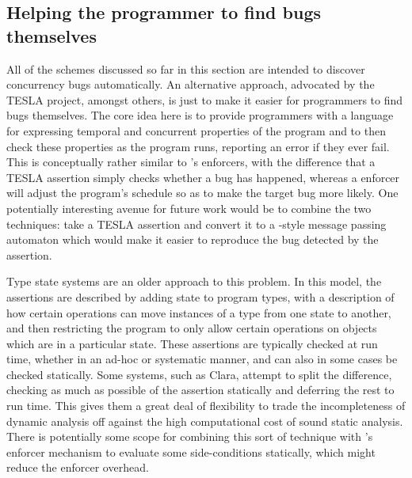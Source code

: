 \subsection{Helping the programmer to find bugs themselves}

All of the schemes discussed so far in this section are intended to
discover concurrency bugs automatically.  An alternative approach,
advocated by the TESLA project\needCite{}, amongst others, is just to
make it easier for programmers to find bugs themselves.  The core idea
here is to provide programmers with a language for expressing temporal
and concurrent properties of the program and to then check these
properties as the program runs, reporting an error if they ever fail.
This is conceptually rather similar to {\technique}'s enforcers, with
the difference that a TESLA assertion simply checks whether a bug has
happened, whereas a {\technique} enforcer will adjust the program's
schedule so as to make the target bug more likely.  One potentially
interesting avenue for future work would be to combine the two
techniques: take a TESLA assertion and convert it to a
{\implementation}-style message passing automaton which would make it
easier to reproduce the bug detected by the assertion.

Type state systems are an older approach to this
problem\cite{Strom1986a}.  In this model, the assertions are described
by adding state to program types, with a description of how certain
operations can move instances of a type from one state to another, and
then restricting the program to only allow certain operations on
objects which are in a particular state.  These assertions are
typically checked at run time\needCite{}, whether in an
ad-hoc\needCite{} or systematic\needCite{} manner, and can also in
some cases be checked statically\needCite{}.  Some systems, such as
Clara\cite{Bodden2010}, attempt to split the difference, checking as much as
possible of the assertion statically and deferring the rest to run
time.  This gives them a great deal of flexibility to trade the
incompleteness of dynamic analysis off against the high computational
cost of sound static analysis.  There is potentially some scope for
combining this sort of technique with {\technique}'s enforcer
mechanism to evaluate some side-conditions statically, which might
reduce the enforcer overhead.




